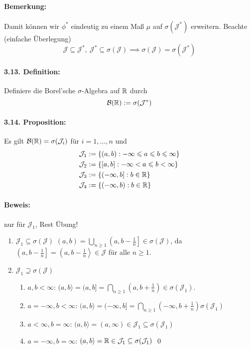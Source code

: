 \paragraph{Bemerkung:} Damit k\"onnen wir $\phi^*$ eindeutig zu einem Ma\ss{} $\mu$ auf $\sigma(\mathcal{J}^*)$ erweitern. Beachte (einfache \"Uberlegung)
$$\mathcal{J}\subseteq\mathcal{J}^*,\ \mathcal{J}^*\subseteq\sigma(\mathcal{J})\implies\sigma(\mathcal{J})=\sigma(\mathcal{J}^*)$$

\paragraph{3.13. Definition:}Definiere die Borel'sche $\sigma$-Algebra auf $\mathbb{R}$ durch
$$\mathcal{B}(\mathbb{R}):=\sigma(\mathcal{J}^*)$$

\paragraph{3.14. Proposition:}Es gilt $\mathcal{B}(\mathbb{R})=\sigma(\mathcal{J}_i)$ f\"ur $i=1,\hdots,n$ und
\begin{align*}
    &\mathcal{J}_1:=\{(a,b):-\infty\leqslant a\leqslant b\leqslant\infty\}\\
    &\mathcal{J}_2:=\{[a,b]:-\infty< a\leqslant b<\infty\}\\
    &\mathcal{J}_3:=\{(-\infty,b]:b\in\mathbb{R}\}\\
    &\mathcal{J}_4:=\{(-\infty,b):b\in\mathbb{R}\}
\end{align*}

\paragraph{Beweis:} nur f\"ur $\mathcal{J}_1$, Rest \"Ubung!
\begin{enumerate}[label=\Roman*.]
    \item $\mathcal{J}_1\subseteq\sigma(\mathcal{J})$\newline
    $(a,b)=\bigcup_{n\geq1}\left(a,b-\frac{1}{n}\right]\in\sigma(\mathcal{J})$, da $\left(a,b-\frac{1}{n}\right]=\left(a,b-\frac{1}{n}\right\rangle\in\mathcal{J}$ f\"ur alle $n\geq1$.
    \item $\mathcal{J}_1\supseteq\sigma(\mathcal{J})$
    \begin{enumerate}[label=(\alph*)]
        \item $a,b<\infty$: $(a,b\rangle=(a,b]=\bigcap_{n\geq1}\left(a,b+\frac{1}{n}\right)\in\sigma(\mathcal{J}_1)$.
        \item $a=-\infty,b<\infty$: $(a,b\rangle=(-\infty,b]=\bigcap_{n\geq1}\left(-\infty,b+\frac{1}{n}\right)\sigma(\mathcal{J}_1)$
        \item $a<\infty,b=\infty$: $(a,b\rangle=(a,\infty)\in\mathcal{J}_1\subseteq\sigma(\mathcal{J}_1)$
        \item $a=-\infty,b=\infty$: $(a,b\rangle=\mathbb{R}\in\mathcal{J}_1\subseteq\sigma(\mathcal{J}_1)$ \qed
    \end{enumerate} 
\end{enumerate}

